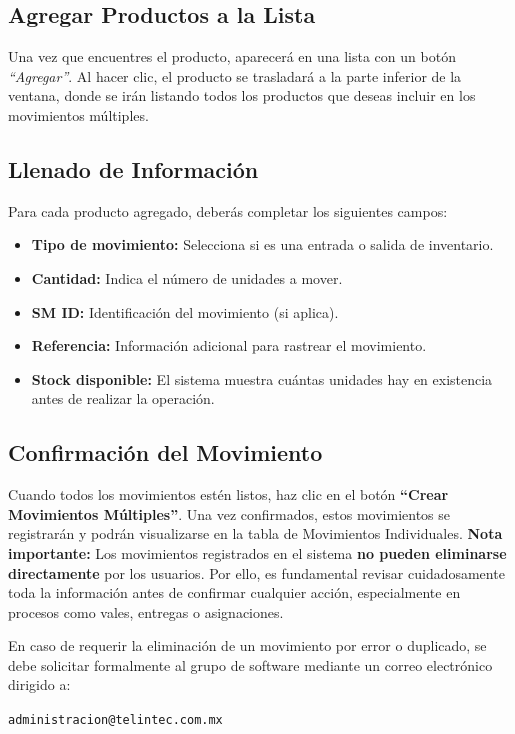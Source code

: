 \subsection*{Agregar Productos a la Lista}
Una vez que encuentres el producto, aparecerá en una lista con un botón \textit{“Agregar”}.  
Al hacer clic, el producto se trasladará a la parte inferior de la ventana, donde se irán listando todos los productos que deseas incluir en los movimientos múltiples.

\subsection*{Llenado de Información}
Para cada producto agregado, deberás completar los siguientes campos:

\begin{itemize}
    \item \textbf{Tipo de movimiento:} Selecciona si es una entrada o salida de inventario.
    \item \textbf{Cantidad:} Indica el número de unidades a mover.
    \item \textbf{SM ID:} Identificación del movimiento (si aplica).
    \item \textbf{Referencia:} Información adicional para rastrear el movimiento.
    \item \textbf{Stock disponible:} El sistema muestra cuántas unidades hay en existencia antes de realizar la operación.
\end{itemize}

\subsection*{Confirmación del Movimiento}
\begin{justify}
    
    Cuando todos los movimientos estén listos, haz clic en el botón \textbf{“Crear Movimientos Múltiples”}.  
    Una vez confirmados, estos movimientos se registrarán y podrán visualizarse en la tabla de Movimientos Individuales.
    \textbf{Nota importante:} Los movimientos registrados en el sistema \textbf{no pueden eliminarse directamente} por los usuarios.  
    Por ello, es fundamental revisar cuidadosamente toda la información antes de confirmar cualquier acción, especialmente en procesos como vales, entregas o asignaciones.
    
    En caso de requerir la eliminación de un movimiento por error o duplicado, se debe solicitar formalmente al grupo de software mediante un correo electrónico dirigido a:
    
    \begin{center}
    \texttt{administracion@telintec.com.mx}
    \end{center}
\end{justify}


